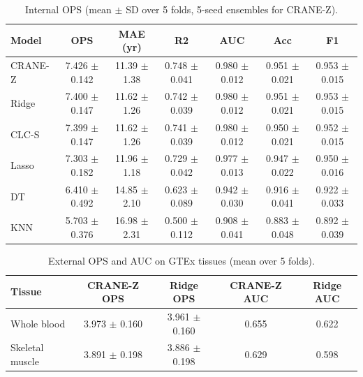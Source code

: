 \documentclass[11pt,a4paper]{article}
\begin{document}
\begin{table}[htbp]
\caption{Internal OPS (mean $\pm$ SD over 5 folds, 5-seed ensembles for CRANE-Z).}
\label{tab:internal}
\begin{center}
\begin{tabular}{lcccccc}
\hline
Model & OPS & MAE (yr) & R2 & AUC & Acc & F1 \\
\hline
CRANE-Z & 7.426 $\pm$ 0.142 & 11.39 $\pm$ 1.38 & 0.748 $\pm$ 0.041 & 0.980 $\pm$ 0.012 & 0.951 $\pm$ 0.021 & 0.953 $\pm$ 0.015 \\
Ridge & 7.400 $\pm$ 0.147 & 11.62 $\pm$ 1.26 & 0.742 $\pm$ 0.039 & 0.980 $\pm$ 0.012 & 0.951 $\pm$ 0.021 & 0.953 $\pm$ 0.015 \\
CLC-S & 7.399 $\pm$ 0.147 & 11.62 $\pm$ 1.26 & 0.741 $\pm$ 0.039 & 0.980 $\pm$ 0.012 & 0.950 $\pm$ 0.021 & 0.952 $\pm$ 0.015 \\
Lasso & 7.303 $\pm$ 0.182 & 11.96 $\pm$ 1.18 & 0.729 $\pm$ 0.042 & 0.977 $\pm$ 0.013 & 0.947 $\pm$ 0.022 & 0.950 $\pm$ 0.016 \\
DT & 6.410 $\pm$ 0.492 & 14.85 $\pm$ 2.10 & 0.623 $\pm$ 0.089 & 0.942 $\pm$ 0.030 & 0.916 $\pm$ 0.041 & 0.922 $\pm$ 0.033 \\
KNN & 5.703 $\pm$ 0.376 & 16.98 $\pm$ 2.31 & 0.500 $\pm$ 0.112 & 0.908 $\pm$ 0.041 & 0.883 $\pm$ 0.048 & 0.892 $\pm$ 0.039 \\
\hline
\end{tabular}
\end{center}
\end{table}

\begin{table}[htbp]
\caption{External OPS and AUC on GTEx tissues (mean over 5 folds).}
\label{tab:external}
\begin{center}
\begin{tabular}{lcccc}
\hline
Tissue & CRANE-Z OPS & Ridge OPS & CRANE-Z AUC & Ridge AUC \\
\hline
Whole blood & 3.973 $\pm$ 0.160 & 3.961 $\pm$ 0.160 & 0.655 & 0.622 \\
Skeletal muscle & 3.891 $\pm$ 0.198 & 3.886 $\pm$ 0.198 & 0.629 & 0.598 \\
\hline
\end{tabular}
\end{center}
\end{table}
\end{document}
